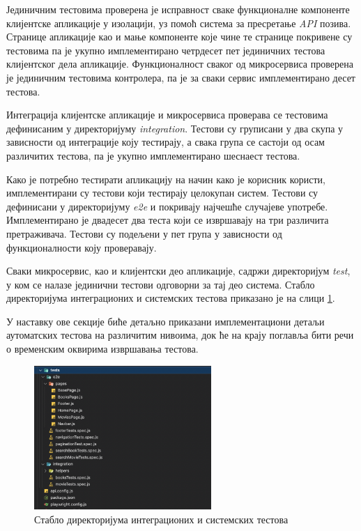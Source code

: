 \documentclass[12pt,oneside]{memoir}
\begin{document}
Јединичним тестовима проверена је исправност сваке функционалне компоненте клијентске апликације у изолацији, уз помоћ система за пресретање \textit{API} позива. Странице апликације као и мање компоненте које чине те странице покривене су тестовима па је укупно имплементирано четрдесет пет јединичних тестова клијентског дела апликације. Функционалност сваког од микросервиса проверена је јединичним тестовима контролера, па је за сваки сервис имплементирано десет тестова.

Интеграција клијентске апликације и микросервиса проверава се тестовима дефинисаним у директоријуму \textit{integration}. Тестови су груписани у два скупа у зависности од интеграције коју тестирају, а свака група се састоји од осам различитих тестова, па је укупно имплементирано шеснаест тестова.

Како је потребно тестирати апликацију на начин како је корисник користи, имплементирани су тестови који тестирају целокупан систем. Тестови су дефинисани у директоријуму \textit{e2e} и покривају најчешће случајеве употребе. Имплементирано је двадесет два теста који се извршавају на три различита претраживача.  Тестови су подељени у пет група у зависности од функционалности коју проверавају.

Сваки микросервис, као и клијентски део апликације, садржи директоријум \textit{test}, у ком се налазе јединични тестови одговорни за тај део система. Стабло директоријума интеграционих и системских тестова приказано је на слици \ref{fig:testTree}.
 
 У наставку ове секције биће детаљно приказани имплементациони детаљи аутоматских тестова на различитим нивоима, док ће на крају поглавља бити речи о временским оквирима извршавања тестова.
  
 \begin{figure}[!ht]
  \centering
  \includegraphics[width=0.6\textwidth]{matfmaster/img/testTree.png}
  \caption{Стабло директоријума интеграционих и системских тестова}
  \label{fig:testTree}
\end{figure}
\end{document}
